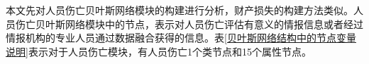\documentclass[bwprint]{gmcmthesis}
\begin{document}
本文先对人员伤亡贝叶斯网络模块的构建进行分析，财产损失的构建方法类似。人员伤亡贝叶斯网络模块中的节点，表示对人员伤亡评估有意义的情报信息或者经过情报机构的专业人员通过数据融合获得的信息。表\ref{贝叶斯网络结构中的节点变量说明}表示对于人员伤亡模块，有人员伤亡1个类节点和15个属性节点。
\end{document}
